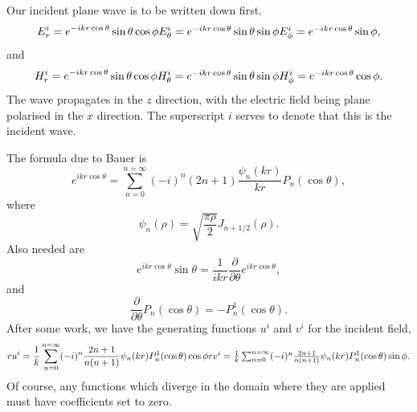 \documentclass[12pt]{article}
\begin{document}
Our incident plane wave is to be written down first.
\begin{equation}
E^i_r=e^{-ikr \cos \theta} \sin \theta \cos \phi
$$    $$
E^i_\theta=e^{-ikr \cos \theta} \sin \theta \sin \phi
$$    $$
E^i_\phi=e^{-ikr \cos \theta}  \sin \phi,
\end{equation}
and 
\begin{equation}
H^i_r=e^{-ikr \cos \theta} \sin \theta \cos \phi
$$    $$
H^i_\theta=e^{-ikr \cos \theta} \sin \theta \sin \phi
$$    $$
H^i_\phi=e^{-ikr \cos \theta}  \cos \phi.
\end{equation}
The wave propagates in the $z$ direction, with the electric field being plane polarised in the $x$ direction.  The superscript $i$ serves to denote that this is the incident wave.

The formula due to Bauer is
\begin{equation}
e^{ikr \cos \theta}=\sum_{n=0}^{n=\infty} (-i)^n (2n+1) 
\frac{\psi_n(k r)}{kr} P_n(\cos \theta),
\end{equation}
where
\begin{equation}
\psi_n(\rho)= \sqrt{ \frac{\pi \rho}{2}} J_{n+1/2}(\rho).
\end{equation}
Also needed are
\begin{equation}
e^{i kr \cos \theta} \sin \theta
=\frac{1}{ikr} \frac{\partial}{\partial \theta} e^{i kr \cos \theta},
\end{equation}
and
\begin{equation}
\frac{\partial}{\partial \theta} P_n(\cos \theta)=-P^1_n(\cos \theta).
\end{equation}
After some work, we have the generating functions $u^i$ and $v^i$
 for the incident field, 
\begin{equation}
ru^i= \frac{1}{k} \sum_{n=0}^{n=\infty} (-i)^n
\frac{ 2n+1}{n(n+1)} \psi_n (k r) P^1_n(\cos \theta) \cos \phi
$$    $$
rv^i= \frac{1}{k} \sum_{n=0}^{n=\infty} (-i)^n
\frac{ 2n+1}{n(n+1)} \psi_n (k r) P^1_n(\cos \theta) \sin \phi.
\end{equation}
Of course, any functions which diverge  in the domain where they are applied 
must have coefficients set to zero.
\end{document}
